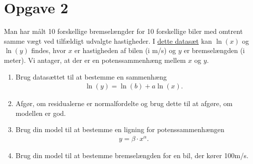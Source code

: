 \section*{Opgave 2}

Man har målt 10 forskellige bremselængder for 10 forskellige biler med omtrent samme vægt ved tilfældigt udvalgte hastigheder. I \href{https://github.com/ChristianJLex/TeachingNotes/raw/master/2022-2023/Data%20og%20lign/logBremselaengde.xlsx}{\color{blue!60}dette datasæt} kan $\ln(x)$ og 
$\ln(y)$ findes, hvor $x$ er hastigheden af bilen (i m/s) og $y$ er bremselængden (i meter). Vi antager, at der er en potenssammenhæng mellem $x$ og $y$.

\begin{enumerate}[label=\roman*)]
	\item Brug datasættet til at bestemme en sammenhæng 
	\begin{align*}
		\ln(y) = \ln(b) +a\ln(x).
	\end{align*}
	\item Afgør, om residualerne er normalfordelte og brug dette til at afgøre, om modellen er god.
	\item Brug din model til at bestemme en ligning for potenssammenhængen
	\begin{align*}
		y = \beta \cdot x^\alpha.
	\end{align*}
	\item Brug din model til at bestemme bremselængden for en bil, der kører 100m/s.
\end{enumerate}
